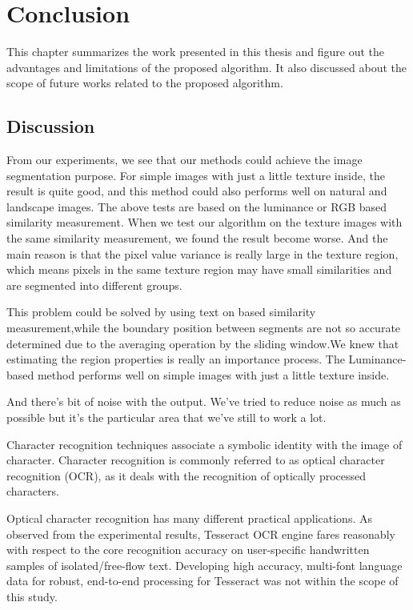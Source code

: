 \chapter{Conclusion}
\label{chap:final}
This chapter summarizes the work presented in this thesis and figure out the advantages and limitations of the proposed algorithm. It also discussed about the scope of future works related to the proposed algorithm.
\section{Discussion}
From our experiments, we see that our methods could achieve the image segmentation purpose. For simple images with just a little texture inside, the result is quite good, and this method could also performs well on natural and landscape images. 
The above tests are based on the luminance or RGB based similarity measurement. When we test our algorithm on the texture images with the same similarity 
measurement, we found the result become worse. And the main reason is that the pixel value variance is really large in the texture region, which means pixels in the 
same texture region may have small similarities and are segmented into different groups.

This problem could be solved by using text on based similarity measurement,while the boundary position between segments are not so accurate determined due to the 
averaging operation by the sliding window.We knew that estimating the region properties is really an importance process. The Luminance-based method performs well on simple images with just a little texture inside.

And there’s bit of noise with the output. We’ve tried to reduce noise as much as possible but it's the particular area that we've still to work a lot.

Character recognition techniques associate a symbolic identity with the image of character. Character recognition is commonly referred to as optical character recognition (OCR), as it deals with the recognition of optically processed characters.

Optical character recognition has many different practical applications. As	observed from the experimental results,    Tesseract OCR engine fares reasonably with respect to the	core    recognition	accuracy	on    user-specific	handwritten   samples   of isolated/free-flow text. Developing high accuracy, multi-font language data for robust, end-to-end processing for Tesseract was not within the scope of this study.

